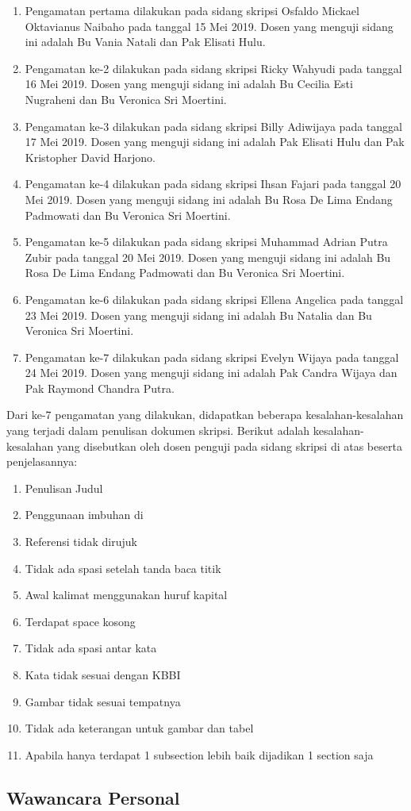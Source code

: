 \begin{enumerate}
	\item Pengamatan pertama dilakukan pada sidang skripsi Osfaldo Mickael Oktavianus Naibaho pada tanggal 15 Mei 2019. Dosen yang menguji sidang ini adalah Bu Vania Natali dan Pak Elisati Hulu.
	
	\item Pengamatan ke-2 dilakukan pada sidang skripsi Ricky Wahyudi pada tanggal 16 Mei 2019. Dosen yang menguji sidang ini adalah Bu Cecilia Esti Nugraheni dan Bu Veronica Sri Moertini.
	
	\item Pengamatan ke-3 dilakukan pada sidang skripsi Billy Adiwijaya pada tanggal 17 Mei 2019. Dosen yang menguji sidang ini adalah Pak Elisati Hulu dan Pak Kristopher David Harjono.
	
	\item Pengamatan ke-4 dilakukan pada sidang skripsi Ihsan Fajari pada tanggal 20 Mei 2019. Dosen yang menguji sidang ini adalah Bu Rosa De Lima Endang Padmowati dan Bu Veronica Sri Moertini.

	\item Pengamatan ke-5 dilakukan pada sidang skripsi Muhammad Adrian Putra Zubir pada tanggal 20 Mei 2019. Dosen yang menguji sidang ini adalah Bu Rosa De Lima Endang Padmowati dan Bu Veronica Sri Moertini.

	\item Pengamatan ke-6 dilakukan pada sidang skripsi Ellena Angelica pada tanggal 23 Mei 2019. Dosen yang menguji sidang ini adalah Bu Natalia dan Bu Veronica Sri Moertini.
	
	\item Pengamatan ke-7 dilakukan pada sidang skripsi Evelyn Wijaya pada tanggal 24 Mei 2019. Dosen yang menguji sidang ini adalah Pak Candra Wijaya dan Pak Raymond Chandra Putra.
\end{enumerate}

Dari ke-7 pengamatan yang dilakukan, didapatkan beberapa kesalahan-kesalahan yang terjadi dalam penulisan dokumen skripsi. Berikut adalah kesalahan-kesalahan yang disebutkan oleh dosen penguji pada sidang skripsi di atas beserta penjelasannya:

\begin{enumerate}
	\item Penulisan Judul
	\item Penggunaan imbuhan di
	\item Referensi tidak dirujuk
	\item Tidak ada spasi setelah tanda baca titik
	\item Awal kalimat menggunakan huruf kapital
	\item Terdapat space kosong
	\item Tidak ada spasi antar kata
	\item Kata tidak sesuai dengan KBBI
	\item Gambar tidak sesuai tempatnya
	\item Tidak ada keterangan untuk gambar dan tabel
	\item Apabila hanya terdapat 1 subsection lebih baik dijadikan 1 section saja
\end{enumerate}

\subsection{Wawancara Personal}

